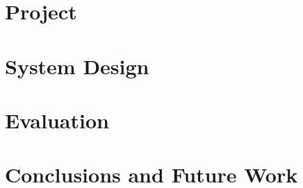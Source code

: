 \documentclass[a4paper, 11pt]{article}
\begin{document}
\pagebreak

\section{Project}

\pagebreak

\section{System Design}

\pagebreak

\section{Evaluation}

\pagebreak

\section{Conclusions and Future Work}

\nocite{*} %

\end{document}
